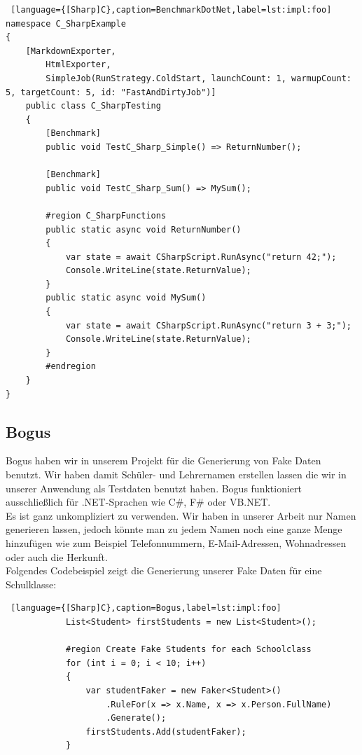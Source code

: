 \begin{lstlisting} [language={[Sharp]C},caption=BenchmarkDotNet,label=lst:impl:foo]
namespace C_SharpExample
{
    [MarkdownExporter,
        HtmlExporter,
        SimpleJob(RunStrategy.ColdStart, launchCount: 1, warmupCount: 5, targetCount: 5, id: "FastAndDirtyJob")]
    public class C_SharpTesting
    {
        [Benchmark]
        public void TestC_Sharp_Simple() => ReturnNumber();

        [Benchmark]
        public void TestC_Sharp_Sum() => MySum();

        #region C_SharpFunctions
        public static async void ReturnNumber()
        {
            var state = await CSharpScript.RunAsync("return 42;");
            Console.WriteLine(state.ReturnValue);
        }
        public static async void MySum()
        {
            var state = await CSharpScript.RunAsync("return 3 + 3;");
            Console.WriteLine(state.ReturnValue);
        }
        #endregion
    }
}
\end{lstlisting}

\newpage
\subsection*{Bogus}

Bogus haben wir in unserem Projekt für die Generierung von Fake Daten benutzt. 
Wir haben damit Schüler- und Lehrernamen erstellen lassen die wir in unserer Anwendung als 
Testdaten benutzt haben. Bogus funktioniert ausschließlich für 
.NET-Sprachen wie C\#, F\# oder VB.NET. \cite{bogus} \\

Es ist ganz unkompliziert zu verwenden. Wir haben in unserer Arbeit nur Namen generieren lassen, 
jedoch könnte man zu jedem Namen noch eine ganze Menge hinzufügen wie zum Beispiel 
Telefonnummern, E-Mail-Adressen, Wohnadressen oder auch die Herkunft.\\

Folgendes Codebeispiel zeigt die Generierung unserer Fake Daten für eine Schulklasse:\\

\begin{lstlisting} [language={[Sharp]C},caption=Bogus,label=lst:impl:foo]
            List<Student> firstStudents = new List<Student>();
                      
            #region Create Fake Students for each Schoolclass
            for (int i = 0; i < 10; i++)
            {
                var studentFaker = new Faker<Student>()
                    .RuleFor(x => x.Name, x => x.Person.FullName)
                    .Generate();
                firstStudents.Add(studentFaker);
            }
\end{lstlisting}

